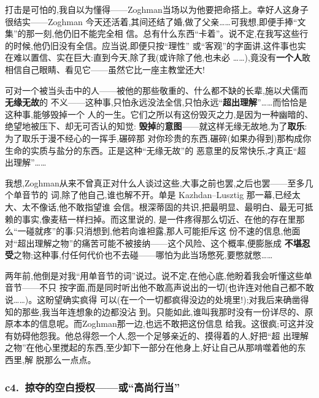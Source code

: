 打击是可怕的,我自以为懂得——Zoghman当场以为他要把命搭上。幸好人这身子很结实——Zoghman
今天还活着,其间还结了婚,做了父亲……可我想,即便手捧“文集”的那一刻,他仍旧不能完全相
信。总有什么东西“卡着”。说不定,在我写这些行的时候,他仍旧没有全信。应当说,即便只按“理性”
或“客观”的字面讲,这件事也实在难以置信、实在巨大:直到今天,除了我(或许除了他,也未必
……),竟没有\textbf{一个人}敢相信自己眼睛、看见它——虽然它比一座主教堂还大!

可对一个被当头击中的人——被他的那些敬重的、什么都不缺的长辈,施以犬儒而\textbf{无缘无故}的
不义——这种事,只怕永远没法全信,只怕永远“\textbf{超出理解}”……而恰恰是这种事,能够毁掉一个
人的一生。它们之所以有这份\dmark{}毁灭之力,是因为一种幽暗的、绝望地被压下、却无可否认的知觉:
\textbf{毁掉}的\textbf{意图}——就这样无缘无故地,为了\textbf{取乐}:为了取乐于漫不经心的一挥手,碾碎那
对你珍贵的东西,碾碎(如果办得到)那构成你生命的实质与盐分的东西。正是这种“无缘无故”的
恶意里的反常快乐,才真正“超出理解”……

我想,Zoghman从来不曾真正对什么人谈过这些,大事之前也罢,之后也罢——至多几个单音节的
词,除了他自己,谁也解不开。单是 Kazhdan--Lusztig 那一幕,已经太大、太不像话,他不敢指望谁
会信。根深蒂固的共识,把最明显、最明白、最无可抵赖的事实,像麦秸一样扫掉。而这里说的,
是一件疼得那么切近、在他的存在里那么“一碰就疼”的事:只消想到,他若向谁袒露,那人可能拒斥这
份不速的信息,他面对“超出理解之物”的痛苦可能不被接纳——这个风险、这个概率,便膨胀成
\textbf{不堪忍受}之物;这种事,付任何代价也不去碰——哪怕为此当场憋死,要憋就憋……

两年前,他倒是对我“用单音节的词”说过。说不定,在他心底,他盼着我会听懂这些单音节——不只
按字面,而是同时听出他不敢高声说出的一切(也许连对他自己都不敢说……)。这盼望确实疯得
可以(在一个一切都疯得没边的处境里!);对我后来确凿得知的那些,我当年连想象的边都没沾
到。只能如此,谁叫我那时没有一份详尽的、原原本本的信息呢。而Zoghman那一边,也远不敢把这份信息
给我。这很疯;可这并没有妨碍他怨我。他总得怨一个人,怨一个足够亲近的、摸得着的人,好把“超
出理解之物”在他心里搅起的东西,至少卸下一部分在他身上,好让自己从那啃噬着他的东西里,解
脱那么一点点。

\subsubsection*{c4.~掠夺的空白授权——或“高尚行当”}

